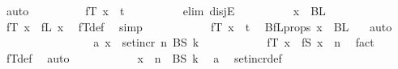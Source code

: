 \begin{isabellebody}
\ auto\isanewline
\ \ \ \ \ \ \isamarkupfalse%
\ \isamarkupfalse%
\ {\isachardoublequoteopen}fT\ x\ {\isasymin}\ {\isacharbraceleft}{\kern0pt}{\isachardot}{\kern0pt}{\isachardot}{\kern0pt}{\isacharless}{\kern0pt}t\ {\isacharplus}{\kern0pt}\ {}{\isacharbraceright}{\kern0pt}{\isachardoublequoteclose}\isanewline
\ \ \ \ \ \ \isamarkupfalse%
\ {\isacharparenleft}{\kern0pt}elim\ disjE{\isacharparenright}{\kern0pt}\isanewline
\ \ \ \ \ \ \ \ \isamarkupfalse%
\ {\isachardoublequoteopen}x\ {\isasymin}\ BL\ {}{\isachardoublequoteclose}\isanewline
\ \ \ \ \ \ \ \ \isamarkupfalse%
\ \isamarkupfalse%
\ {\isachardoublequoteopen}fT\ x\ {\isacharequal}{\kern0pt}\ fL\ x{\isachardoublequoteclose}\ \isamarkupfalse%
\ fT{\isacharunderscore}{\kern0pt}def\ \isamarkupfalse%
\ simp\isanewline
\ \ \ \ \ \ \ \ \isamarkupfalse%
\ \isamarkupfalse%
\ {\isachardoublequoteopen}fT\ x\ {\isasymin}\ {\isacharbraceleft}{\kern0pt}{\isachardot}{\kern0pt}{\isachardot}{\kern0pt}{\isacharless}{\kern0pt}t{\isacharplus}{\kern0pt}{}{\isacharbraceright}{\kern0pt}{\isachardoublequoteclose}\ \isamarkupfalse%
\ BfL{\isacharunderscore}{\kern0pt}props\ {\isacartoucheopen}x\ {\isasymin}\ BL\ {}{\isacartoucheclose}\ \isamarkupfalse%
\ auto\isanewline
\ \ \ \ \ \ \isamarkupfalse%
\isanewline
\ \ \ \ \ \ \ \ \isamarkupfalse%
\ a{\isacharcolon}{\kern0pt}\ {\isachardoublequoteopen}x\ {\isasymin}\ set{\isacharunderscore}{\kern0pt}incr\ n\ {\isacharparenleft}{\kern0pt}BS\ k{\isacharparenright}{\kern0pt}{\isachardoublequoteclose}\isanewline
\ \ \ \ \ \ \ \ \isamarkupfalse%
\ \isamarkupfalse%
\ {\isachardoublequoteopen}fT\ x\ {\isacharequal}{\kern0pt}\ fS\ {\isacharparenleft}{\kern0pt}x\ {\isacharminus}{\kern0pt}\ n{\isacharparenright}{\kern0pt}{\isachardoublequoteclose}\ \isamarkupfalse%
\ fact{}\ \isamarkupfalse%
\ fT{\isacharunderscore}{\kern0pt}def\ \isamarkupfalse%
\ auto\isanewline
\ \ \ \ \ \ \ \ \isamarkupfalse%
\ \isamarkupfalse%
\ {\isachardoublequoteopen}x\ {\isacharminus}{\kern0pt}\ n\ {\isasymin}\ BS\ k{\isachardoublequoteclose}\ \isamarkupfalse%
\ a\ \isamarkupfalse%
\ set{\isacharunderscore}{\kern0pt}incr{\isacharunderscore}{\kern0pt}def\ \isamarkupfalse%

\end{isabellebody}
